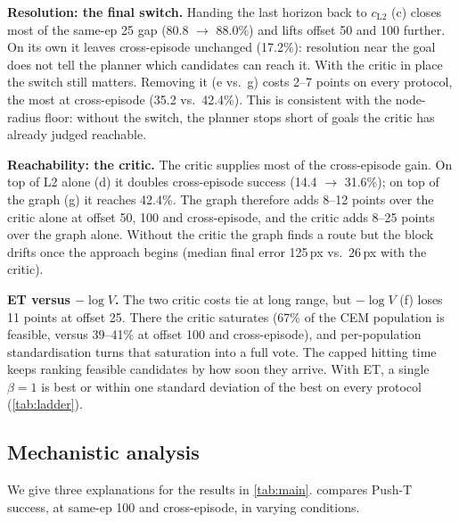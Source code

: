 \documentclass{article} %
\begin{document}
\textbf{Resolution: the final switch.} Handing the last horizon back to $c_{\mathrm{L2}}$ (c)
closes most of the same-ep 25 gap (80.8 $\to$ 88.0\%) and lifts offset 50 and 100 further. On
its own it leaves cross-episode unchanged (17.2\%): resolution near the goal does not tell the
planner which candidates can reach it. With the critic in place the switch still matters.
Removing it (e vs.\ g) costs 2--7 points on every protocol, the most at cross-episode
(35.2 vs.\ 42.4\%). This is consistent with the node-radius floor: without the switch, the
planner stops short of goals the critic has already judged reachable.

\textbf{Reachability: the critic.} The critic supplies most of the cross-episode gain. On top
of L2 alone (d) it doubles cross-episode success (14.4 $\to$ 31.6\%); on top of the graph (g) it
reaches 42.4\%. The graph therefore adds 8--12 points over the critic alone at offset 50, 100
and cross-episode, and the critic adds 8--25 points over the graph alone. Without the critic the
graph finds a route but the block drifts once the approach begins (median final error 125\,px
vs.\ 26\,px with the critic).

\textbf{ET versus $-\log V$.} The two critic costs tie at long range, but $-\log V$ (f) loses
11 points at offset 25. There the critic saturates (67\% of the CEM population is feasible,
versus 39--41\% at offset 100 and cross-episode), and per-population standardisation turns that
saturation into a full vote. The capped hitting time keeps ranking feasible candidates by how
soon they arrive. With ET, a single $\beta=1$ is best or within one standard deviation of the
best on every protocol (\cref{tab:ladder}).

\subsection{Mechanistic analysis}
\label{sec:analysis}
We give three explanations for the results in \cref{tab:main}. 
compares Push-T success, at same-ep 100 and
cross-episode, in varying conditions.
\end{document}
